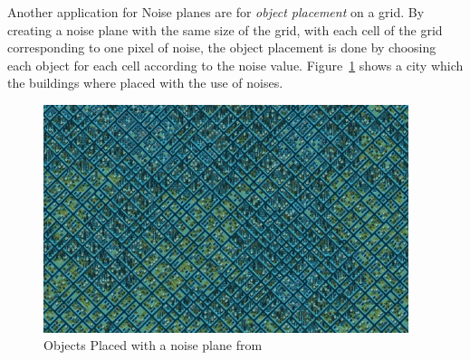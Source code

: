 Another application for Noise planes are for \emph{object placement} on a grid. By creating a noise plane with the same size of the grid, with each cell of the grid corresponding to one pixel of noise, the object placement is done by choosing each object for each cell according to the noise value. Figure~\ref{fig:NCity} shows a city which the buildings where placed with the use of noises.

\begin{figure}[htbp]
	\centering
	\includegraphics[width=0.95\textwidth]{img/Theory/Perlin_Noise/NoisyCity.jpg}
	\caption{Objects Placed with a noise plane from \cite{NoisesGAMES}}
	\label{fig:NCity}
\end{figure}



